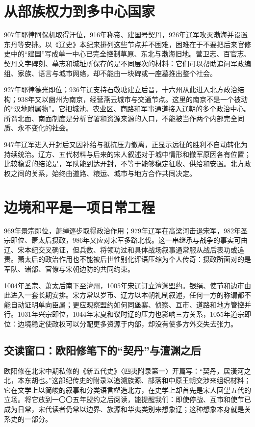 \section{从部族权力到多中心国家}

907年耶律阿保机取得汗位，916年称帝、建国号契丹，926年辽军攻灭渤海并设置东丹等安排。以《辽史》本纪来排列这些节点并不困难，困难在于不要把后来官修史中的“建国”写成单一中心已完全控制草原、东北与渤海旧地。营卫志、百官志、契丹文字碑刻、墓志和城址所保存的是不同层次的材料：它们可以帮助追问军政编组、家族、语言与城市网络，却不能由一块碑或一座墓推出整个社会。

927年耶律德光即位；936年辽支持石敬瑭建立后晋，十六州从此进入北方政治结构；938年又以幽州为南京，经营燕云城市与交通节点。这里的南京不是一个被动的“汉地附属物”。它把城池、农业区、商路和军事通道接入辽朝的多个政治中心。所谓北面、南面制度是分析官署和资源来源的入口，不能被当作两个内部完全同质、永不变化的社会。

947年辽军进入开封后又因补给与抵抗压力撤离，正显示远征的胜利不自动转化为持续统治。辽方、五代材料与后来的宋人叙述对于城中情形和撤军原因各有位置；比较稳妥的结论是，军队能到达开封，不等于能够稳定征收、供给和安置。北方政权之间的关系，始终由道路、粮运、城市与地方合作共同决定。

\section{边境和平是一项日常工程}

969年景宗即位，萧绰逐步取得政治作用；979年辽军在高梁河击退宋军，982年圣宗即位、萧太后摄政，986年又应对宋军多路北伐。这一串继承与战争的事实可由辽、宋本纪交叉确证，但兵数、将领功过和具体战场叙事通常服从战后表功或追责。萧太后的政治作用也不能被后世性别化评语压缩为个人传奇：摄政所面对的是军队、诸部、官僚与宋朝边防的共同约束。

1004年圣宗、萧太后南下至澶州，1005年宋辽订立澶渊盟约。银绢、使节和边市由此进入一套长期安排。宋方常以岁币、辽方以本朝礼制叙述，任何一方的称谓都不能自动证明单向臣属；更应观察盟约如何同堡寨、侦察、互市、道路和地方管控并行。1031年兴宗即位，1044年宋夏和议时辽的压力也影响三方关系，1055年道宗即位：边境稳定使政权可以分配更多资源于内部，却没有使多方外交失去张力。

\subsection{交读窗口：欧阳修笔下的“契丹”与澶渊之后}

欧阳修在北宋中期私修的《新五代史》〈四夷附录第一〉开篇写：“契丹，居潢河之北，本东胡也。”这部纪传史的附录以追溯族源、部落和中原王朝交涉来组织材料；它在文学上以简峻的叙事和分类语言塑造北方，在史学上却首先是宋人回望五代的立场。将它放到一〇〇五年盟约之后阅读，能提醒我们：即使停战、互市和使节已成为日常，宋代读者仍常以边界、族源和华夷类别来想象辽；这种想象本身就是关系史的一部分。

